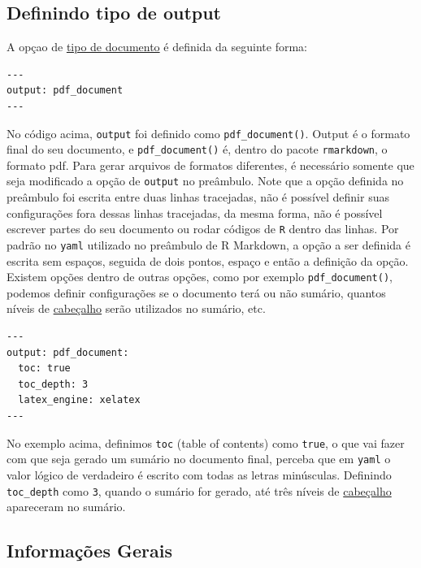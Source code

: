 \documentclass[
]{book}
\begin{document}
\hypertarget{definindo-tipo-de-output}{%
\subsection{Definindo tipo de output}\label{definindo-tipo-de-output}}

A opçao de \protect\hyperlink{possuxedveis-tipos-de-outputs}{tipo de documento} é definida da seguinte forma:

\begin{verbatim}
---
output: pdf_document
---
\end{verbatim}

No código acima, \texttt{output} foi definido como \texttt{pdf\_document()}. Output é o formato final do seu documento, e \texttt{pdf\_document()} é, dentro do pacote \texttt{rmarkdown}, o formato pdf. Para gerar arquivos de formatos diferentes, é necessário somente que seja modificado a opção de \texttt{output} no preâmbulo.
Note que a opção definida no preâmbulo foi escrita entre duas linhas tracejadas, não é possível definir suas configurações fora dessas linhas tracejadas, da mesma forma, não é possível escrever partes do seu documento ou rodar códigos de \texttt{R} dentro das linhas.
Por padrão no \texttt{yaml} utilizado no preâmbulo de R Markdown, a opção a ser definida é escrita sem espaços, seguida de dois pontos, espaço e então a definição da opção.
Existem opções dentro de outras opções, como por exemplo \texttt{pdf\_document()}, podemos definir configurações se o documento terá ou não sumário, quantos níveis de \protect\hyperlink{cabeuxe7alhos}{cabeçalho} serão utilizados no sumário, etc.

\begin{verbatim}
---
output: pdf_document:
  toc: true
  toc_depth: 3
  latex_engine: xelatex
---
\end{verbatim}

No exemplo acima, definimos \texttt{toc} (table of contents) como \texttt{true}, o que vai fazer com que seja gerado um sumário no documento final, perceba que em \texttt{yaml} o valor lógico de verdadeiro é escrito com todas as letras minúsculas. Definindo \texttt{toc\_depth} como \texttt{3}, quando o sumário for gerado, até três níveis de \protect\hyperlink{cabeuxe7alhos}{cabeçalho} apareceram no sumário.

\hypertarget{informauxe7uxf5es-gerais}{%
\subsection{Informações Gerais}\label{informauxe7uxf5es-gerais}}
\end{document}
